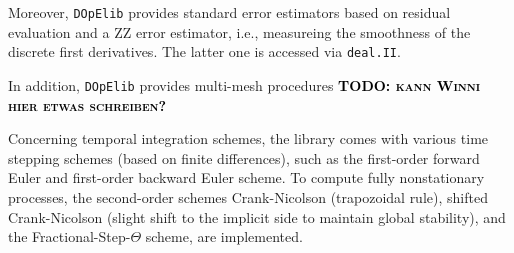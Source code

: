 \documentclass[prodmode,acmtoms]{acmsmall}
\numberwithin{equation}{section}
\newcommand{\deal}{\texttt{deal.II}}
\newcommand{\dope}{\texttt{DOpElib}}
\newcommand{\todo}[1]{\textbf{\textsc{\textcolor{black}{TODO: #1}}}}
\begin{document}
Moreover, \dope{} provides standard error estimators based on residual evaluation and 
a ZZ error estimator, i.e., measureing the smoothness of the discrete first derivatives.
The latter one is accessed via \deal{}. 

In addition, \dope{} provides multi-mesh procedures 
\todo{kann Winni hier etwas schreiben?}

Concerning temporal integration schemes, the library comes 
with various time stepping schemes (based on finite differences), 
such as the first-order forward Euler and first-order backward Euler scheme. 
To compute fully nonstationary processes, the second-order schemes
Crank-Nicolson (trapozoidal rule), 
shifted Crank-Nicolson (slight shift to the implicit side to maintain
global stability), 
and the Fractional-Step-$\Theta$ scheme, are implemented.
\end{document}
